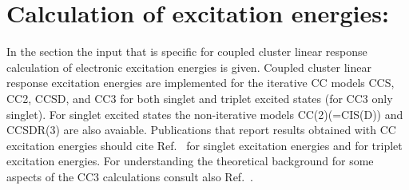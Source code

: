 
\section{Calculation of excitation energies: }\label{sec:ccexci}

In the  section the input that is
specific for coupled cluster linear response calculation of
electronic excitation energies is given. 
Coupled cluster linear response excitation energies 
are implemented for the iterative CC models CCS, CC2, CCSD, and CC3 for 
both singlet and triplet excited states (for CC3 only singlet).
For singlet excited states the non-iterative models CC(2)(=CIS(D)) and CCSDR(3)
are also avaiable.
Publications that report results obtained with CC excitation energies
should cite Ref.\ \cite{Christiansen:JCP105} for singlet excitation energies
and \cite{Hald:JCP113} for triplet excitation energies.
For understanding the theoretical background for some
aspects of the CC3 calculations consult also Ref.\ \cite{Christiansen:JCP103}.

